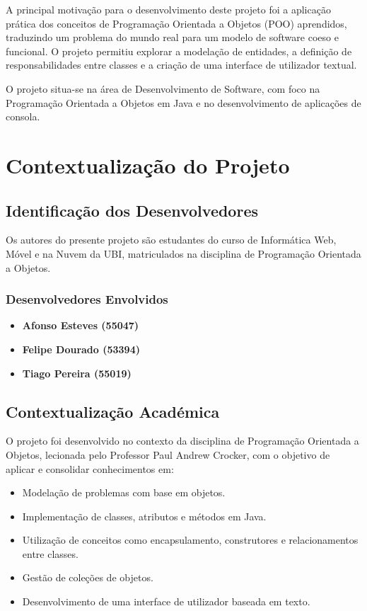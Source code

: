 \documentclass[a4paper,12pt]{article}
\begin{document}
A principal motivação para o desenvolvimento deste projeto foi a aplicação prática dos conceitos de Programação Orientada a Objetos (POO) aprendidos, traduzindo um problema do mundo real para um modelo de software coeso e funcional. O projeto permitiu explorar a modelação de entidades, a definição de responsabilidades entre classes e a criação de uma interface de utilizador textual.

O projeto situa-se na área de Desenvolvimento de Software, com foco na Programação Orientada a Objetos em Java e no desenvolvimento de aplicações de consola.

\section{Contextualização do Projeto}

\subsection{Identificação dos Desenvolvedores}
Os autores do presente projeto são estudantes do curso de Informática Web, Móvel e na Nuvem da \ac{UBI}, matriculados na disciplina de Programação Orientada a Objetos.

\subsubsection{Desenvolvedores Envolvidos}
\begin{itemize}
    \item \textbf{Afonso Esteves (55047)}
    \item \textbf{Felipe Dourado (53394)}
    \item \textbf{Tiago Pereira (55019)}
\end{itemize}     

\subsection{Contextualização Académica}
O projeto foi desenvolvido no contexto da disciplina de Programação Orientada a Objetos, lecionada pelo Professor Paul Andrew Crocker, com o objetivo de aplicar e consolidar conhecimentos em:
\begin{itemize}
    \item Modelação de problemas com base em objetos.
    \item Implementação de classes, atributos e métodos em Java.
    \item Utilização de conceitos como encapsulamento, construtores e relacionamentos entre classes.
    \item Gestão de coleções de objetos.
    \item Desenvolvimento de uma interface de utilizador baseada em texto.
\end{itemize}
\end{document}
